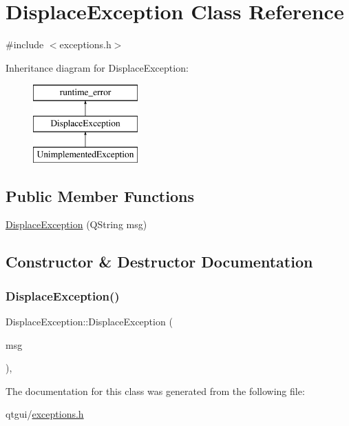 \hypertarget{class_displace_exception}{}\section{Displace\+Exception Class Reference}
\label{class_displace_exception}


{\ttfamily \#include $<$exceptions.\+h$>$}

Inheritance diagram for Displace\+Exception\+:\begin{figure}[H]
\begin{center}
\leavevmode
\includegraphics[height=3.000000cm]{d0/db9/class_displace_exception}
\end{center}
\end{figure}
\subsection*{Public Member Functions}
\begin{DoxyCompactItemize}
\item 
\mbox{\hyperlink{class_displace_exception_a71959ae38eba4226c6251bc704a5a400}{Displace\+Exception}} (Q\+String msg)
\end{DoxyCompactItemize}


\subsection{Constructor \& Destructor Documentation}
\mbox{\label{class_displace_exception_a71959ae38eba4226c6251bc704a5a400}} 
\subsubsection{\texorpdfstring{DisplaceException()}{DisplaceException()}}
{\footnotesize\ttfamily Displace\+Exception\+::\+Displace\+Exception (\begin{DoxyParamCaption}\item[{Q\+String}]{msg }\end{DoxyParamCaption})\hspace{0.3cm}{\ttfamily [inline]}, {\ttfamily [explicit]}}



The documentation for this class was generated from the following file\+:\begin{DoxyCompactItemize}
\item 
qtgui/\mbox{\hyperlink{exceptions_8h}{exceptions.\+h}}\end{DoxyCompactItemize}
